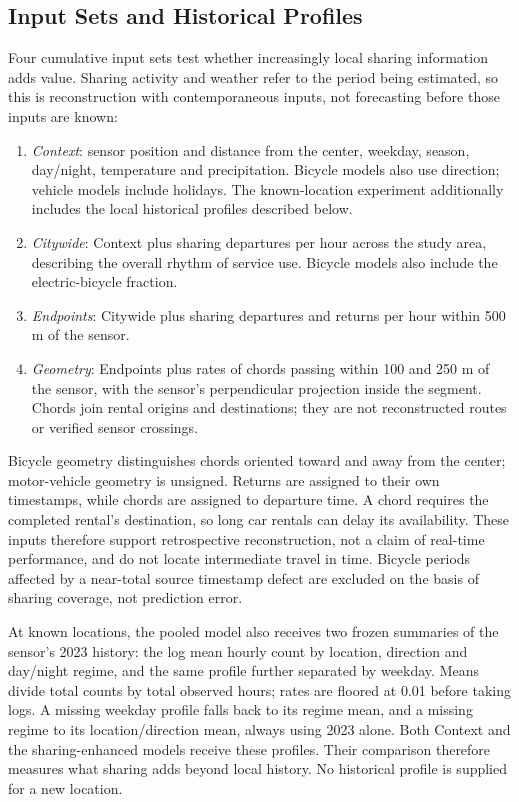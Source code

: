 \documentclass[]{interact}
\begin{document}
\subsection{Input Sets and Historical Profiles}
Four cumulative input sets test whether increasingly local sharing information adds value. Sharing activity and weather refer to the period being estimated, so this is reconstruction with contemporaneous inputs, not forecasting before those inputs are known:
\begin{enumerate}
\item \emph{Context}: sensor position and distance from the center, weekday, season, day/night, temperature and precipitation. Bicycle models also use direction; vehicle models include holidays. The known-location experiment additionally includes the local historical profiles described below.
\item \emph{Citywide}: Context plus sharing departures per hour across the study area, describing the overall rhythm of service use. Bicycle models also include the electric-bicycle fraction.
\item \emph{Endpoints}: Citywide plus sharing departures and returns per hour within 500 m of the sensor.
\item \emph{Geometry}: Endpoints plus rates of chords passing within 100 and 250 m of the sensor, with the sensor's perpendicular projection inside the segment. Chords join rental origins and destinations; they are not reconstructed routes or verified sensor crossings.
\end{enumerate}
Bicycle geometry distinguishes chords oriented toward and away from the center; motor-vehicle geometry is unsigned. Returns are assigned to their own timestamps, while chords are assigned to departure time. A chord requires the completed rental's destination, so long car rentals can delay its availability. These inputs therefore support retrospective reconstruction, not a claim of real-time performance, and do not locate intermediate travel in time. Bicycle periods affected by a near-total source timestamp defect are excluded on the basis of sharing coverage, not prediction error.

At known locations, the pooled model also receives two frozen summaries of the sensor's 2023 history: the log mean hourly count by location, direction and day/night regime, and the same profile further separated by weekday. Means divide total counts by total observed hours; rates are floored at 0.01 before taking logs. A missing weekday profile falls back to its regime mean, and a missing regime to its location/direction mean, always using 2023 alone. Both Context and the sharing-enhanced models receive these profiles. Their comparison therefore measures what sharing adds beyond local history. No historical profile is supplied for a new location.
\end{document}
